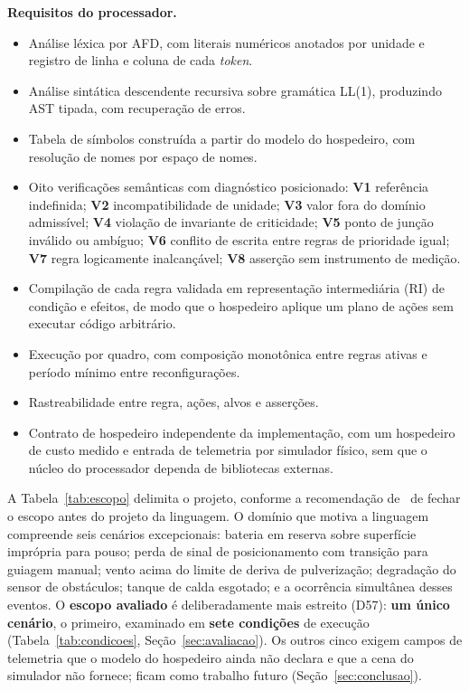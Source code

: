 \documentclass[conference]{IEEEtran}
\begin{document}
\textbf{Requisitos do processador.}
\begin{itemize}
\item[\textbf{P1}] Análise léxica por AFD, com literais numéricos anotados por
unidade e registro de linha e coluna de cada \textit{token}.
\item[\textbf{P2}] Análise sintática descendente recursiva sobre gramática
LL(1), produzindo AST tipada, com recuperação de erros.
\item[\textbf{P3}] Tabela de símbolos construída a partir do modelo do
hospedeiro, com resolução de nomes por espaço de nomes.
\item[\textbf{P4}] Oito verificações semânticas com diagnóstico posicionado:
\textbf{V1} referência indefinida; \textbf{V2} incompatibilidade de unidade;
\textbf{V3} valor fora do domínio admissível; \textbf{V4} violação de
invariante de criticidade; \textbf{V5} ponto de junção inválido ou
ambíguo; \textbf{V6} conflito de escrita entre regras de prioridade igual;
\textbf{V7} regra logicamente inalcançável; \textbf{V8} asserção sem
instrumento de medição.
\item[\textbf{P5}] Compilação de cada regra validada em representação
intermediária (RI) de condição e efeitos, de modo que o hospedeiro aplique um
plano de ações sem executar código arbitrário.
\item[\textbf{P6}] Execução por quadro, com composição monotônica entre regras
ativas e período mínimo entre reconfigurações.
\item[\textbf{P7}] Rastreabilidade entre regra, ações, alvos e asserções.
\item[\textbf{P8}] Contrato de hospedeiro independente da implementação, com
um hospedeiro de custo medido e entrada de telemetria por simulador físico,
sem que o núcleo do processador dependa de bibliotecas externas.
\end{itemize}

A Tabela~\ref{tab:escopo} delimita o projeto, conforme a recomendação
de~\cite{mernik2005} de fechar o escopo antes do projeto da linguagem. O
domínio que motiva a linguagem compreende seis cenários excepcionais: bateria
em reserva sobre superfície imprópria para pouso; perda de sinal de
posicionamento com transição para guiagem manual; vento acima do limite de
deriva de pulverização; degradação do sensor de obstáculos; tanque de calda
esgotado; e a ocorrência simultânea desses eventos. O \textbf{escopo avaliado}
é deliberadamente mais estreito (D57): \textbf{um único cenário}, o primeiro,
examinado em \textbf{sete condições} de execução (Tabela~\ref{tab:condicoes},
Seção~\ref{sec:avaliacao}). Os outros cinco exigem campos de telemetria que o
modelo do hospedeiro ainda não declara e que a cena do simulador não fornece;
ficam como trabalho futuro (Seção~\ref{sec:conclusao}).
\end{document}
